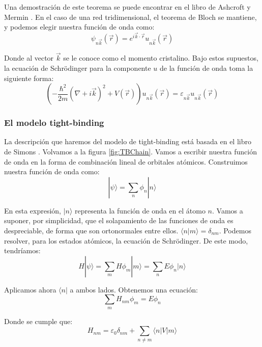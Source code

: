 \documentclass[12pt,twoside]{article}
\begin{document}
Una demostración de este teorema se puede encontrar en el libro de Ashcroft y Mermin \cite{AshcroftSSP}. En el caso de una red tridimensional, el teorema de Bloch se mantiene, y podemos elegir nuestra función de onda como:
\begin{equation}
  \psi_{n\vec{k}}(\vec{r}) = e^{i\vec{k}\cdot\vec{r}}u_{n\vec{k}}(\vec{r})
\end{equation}

Donde al vector $\vec{k}$ se le conoce como el momento cristalino. Bajo estos supuestos, la ecuación de Schrödinger para la componente $u$ de la función de onda toma la siguiente forma:
\begin{equation}
  \left(-\frac{\hbar^2}{2m}(\nabla + i\vec{k})^2 + V(\vec{r})\right)u_{n\vec{k}}(\vec{r}) = \varepsilon_{n\vec{k}}u_{n\vec{k}}(\vec{r})
\end{equation}
\subsubsection{El modelo tight-binding}

La descripción que haremos del modelo de tight-binding está basada en el libro de Simons \cite{simon2013oxford}. Volvamos a la figura \ref{fig:TBChain}. Vamos a escribir nuestra función de onda en la forma de combinación lineal de orbitales atómicos. Construimos nuestra función de onda como:
\begin{equation}
  |\psi\rangle = \sum_n\phi_n|n\rangle
\end{equation}

En esta expresión, $|n\rangle$ representa la función de onda en el átomo $n$. Vamos a suponer, por simplicidad, que el solapamiento de las funciones de onda es despreciable, de forma que son ortonormales entre ellos. $\langle n|m\rangle = \delta_{nm}$. Podemos resolver, para los estados atómicos, la ecuación de Schrödinger. De este modo, tendríamos:
$$
H|\psi\rangle = \sum_m H \phi_m |m\rangle = \sum_n E \phi_{n} |n\rangle
$$

Aplicamos ahora $\langle n|$ a ambos lados. Obtenemos una ecuación:
\begin{equation}
  \sum_m H_{nm}\phi_m = E\phi_n
\end{equation}

Donde se cumple que:
\begin{equation}
  H_{nm} = \varepsilon_0\delta_{nm} + \sum_{n\neq m}\langle n | V | m \rangle
  \label{eq:hamElements}
\end{equation}
\end{document}
